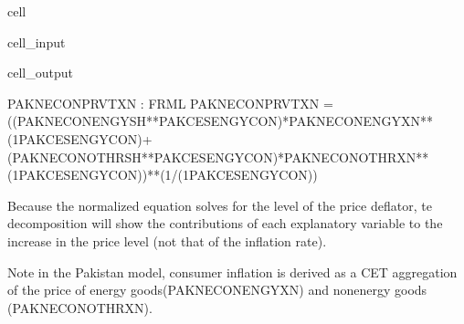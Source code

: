 \documentclass[letterpaper,10pt,english]{jupyterBook}
\begin{document}
\begin{sphinxuseclass}{cell}\begin{sphinxVerbatimInput}

\begin{sphinxuseclass}{cell_input}
\begin{sphinxVerbatim}[commandchars=\\\{\}]
\PYG{p}{[}\PYG{p}{]}
\end{sphinxVerbatim}

\end{sphinxuseclass}\end{sphinxVerbatimInput}
\begin{sphinxVerbatimOutput}

\begin{sphinxuseclass}{cell_output}
\begin{sphinxVerbatim}[commandchars=\\\{\}]
PAKNECONPRVTXN : FRML \PYGZlt{}\PYGZgt{} PAKNECONPRVTXN = ((PAKNECONENGYSH**PAKCESENGYCON)*PAKNECONENGYXN**(1\PYGZhy{}PAKCESENGYCON)+(PAKNECONOTHRSH**PAKCESENGYCON)*PAKNECONOTHRXN**(1\PYGZhy{}PAKCESENGYCON))**(1/(1\PYGZhy{}PAKCESENGYCON)) \PYGZdl{}
\end{sphinxVerbatim}

\end{sphinxuseclass}\end{sphinxVerbatimOutput}

\end{sphinxuseclass}
\sphinxAtStartPar
Because the normalized equation solves for the level of the price deflator, te decomposition will show the contributions of each explanatory variable to the increase in the price level (not that of the inflation rate).

\sphinxAtStartPar
Note in the Pakistan model, consumer inflation is derived as a CET aggregation of the price of energy goods(PAKNECONENGYXN) and non\sphinxhyphen{}energy goods (PAKNECONOTHRXN).
\end{document}
